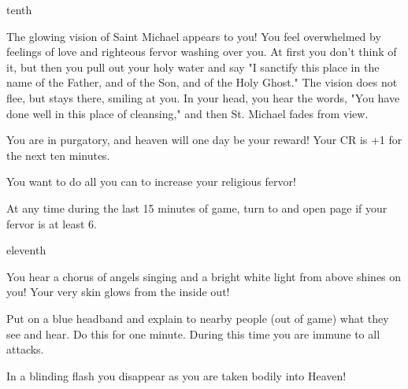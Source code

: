 \documentclass[greennotebook]{guildcamp4} %
\begin{document}
\begin{page}{tenth}

The glowing vision of Saint Michael appears to you! You feel overwhelmed by feelings of love and righteous fervor washing over you. At first you don't think of it, but then you pull out your holy water and say "I sanctify this place in the name of the Father, and of the Son, and of the Holy Ghost." The vision does not flee, but stays there, smiling at you. In your head, you hear the words, "You have done well in this place of cleansing," and then St. Michael fades from view. 

You are in purgatory, and heaven will one day be your reward! Your CR is +1 for the next ten minutes.

You want to do all you can to increase your religious fervor!

At any time during the last 15 minutes of game, turn to and open page  if your fervor is at least 6.

\end{page}

\begin{page}{eleventh}

You hear a chorus of angels singing and a bright white light from above shines on you! Your very skin glows from the inside out!

Put on a blue headband and explain to nearby people (out of game) what they see and hear. Do this for one minute. During this time you are immune to all attacks.

In a blinding flash you disappear as you are taken bodily into Heaven!

\end{page}

\endnotebook
\end{document}
